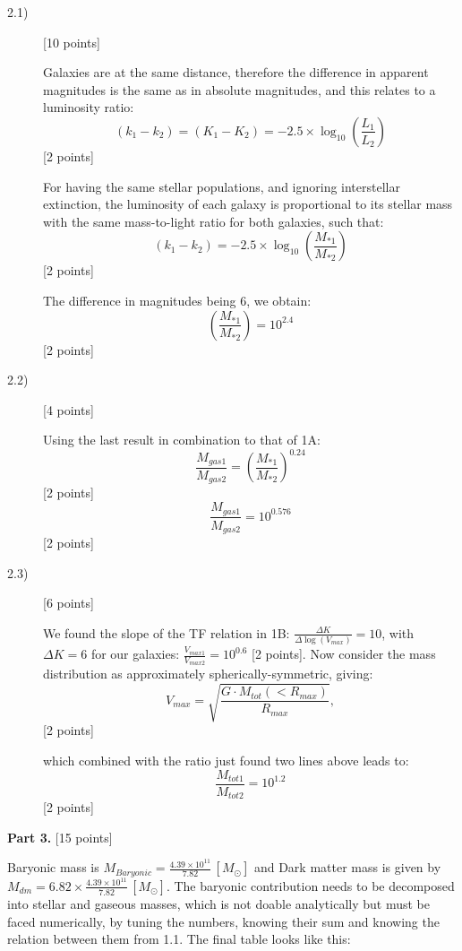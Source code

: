 \begin{description}
\item[2.1)] \hfill[10 points]

  Galaxies are at the same distance, therefore the difference in apparent
  magnitudes is the same as in absolute magnitudes, and this relates to a
  luminosity ratio:
  \[ (k_1 - k_2) = (K_1 - K_2)
     = -2.5\times\log_{10}\!\left(\frac{L_1}{L_2}\right) \]
  \hfill[2 points]

  For having the same stellar populations, and ignoring interstellar
  extinction, the luminosity of each galaxy is proportional to its
  stellar mass with the same mass-to-light ratio for both galaxies, such
  that:
  \[ (k_1 - k_2) = -2.5\times\log_{10}
     \!\left(\frac{M_{*1}}{M_{*2}}\right) \]
  \hfill[2 points]

  The difference in magnitudes being 6, we obtain:
  \[ \left(\frac{M_{*1}}{M_{*2}}\right) = 10^{2.4} \]
  \hfill[2 points]

\item[2.2)] \hfill[4 points]

  Using the last result in combination to that of 1A:
  \[ \frac{M_{gas1}}{M_{gas2}}
     = \left(\frac{M_{*1}}{M_{*2}}\right)^{0.24} \]
  \hfill[2 points]
  \[ \frac{M_{gas1}}{M_{gas2}} = 10^{0.576} \]
  \hfill[2 points]

\item[2.3)] \hfill[6 points]

  We found the slope of the TF relation in 1B:
  $\frac{\Delta K}{\Delta\log(V_{max})} = 10$, with $\Delta K = 6$ for
  our galaxies: $\frac{V_{max1}}{V_{max2}} = 10^{0.6}$ [2 points]. Now
  consider the mass distribution as approximately
  spherically-symmetric, giving:
  \[ V_{max} = \sqrt{\frac{G\cdot M_{tot}(<R_{max})}{R_{max}}}, \]
  \hfill[2 points]

  which combined with the ratio just found two lines above leads to:
  \[ \frac{M_{tot1}}{M_{tot2}} = 10^{1.2} \]
  \hfill[2 points]
\end{description}

\textbf{Part 3.} \hfill[15 points]

Baryonic mass is
$M_{Baryonic} = \frac{4.39\times 10^{11}}{7.82}\,[M_\odot]$ and Dark
matter mass is given by
$M_{dm} = 6.82\times\frac{4.39\times 10^{11}}{7.82}\,[M_\odot]$. The
baryonic contribution needs to be decomposed into stellar and gaseous
masses, which is not doable analytically but must be faced numerically,
by tuning the numbers, knowing their sum and knowing the relation between
them from 1.1. The final table looks like this:

